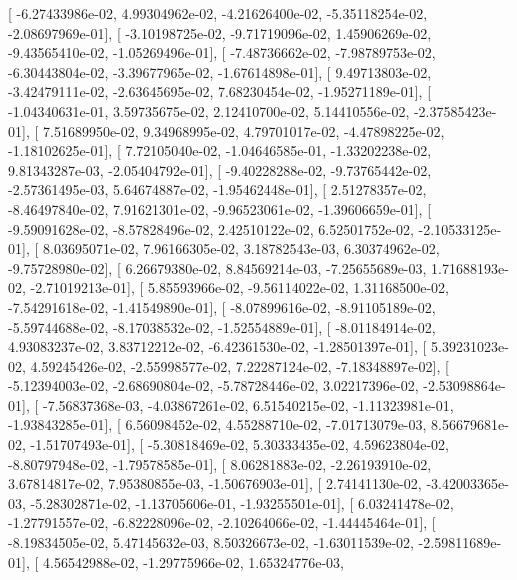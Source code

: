 \documentclass{article}
\begin{document}
       [ -6.27433986e-02,   4.99304962e-02,  -4.21626400e-02,
         -5.35118254e-02,  -2.08697969e-01],
       [ -3.10198725e-02,  -9.71719096e-02,   1.45906269e-02,
         -9.43565410e-02,  -1.05269496e-01],
       [ -7.48736662e-02,  -7.98789753e-02,  -6.30443804e-02,
         -3.39677965e-02,  -1.67614898e-01],
       [  9.49713803e-02,  -3.42479111e-02,  -2.63645695e-02,
          7.68230454e-02,  -1.95271189e-01],
       [ -1.04340631e-01,   3.59735675e-02,   2.12410700e-02,
          5.14410556e-02,  -2.37585423e-01],
       [  7.51689950e-02,   9.34968995e-02,   4.79701017e-02,
         -4.47898225e-02,  -1.18102625e-01],
       [  7.72105040e-02,  -1.04646585e-01,  -1.33202238e-02,
          9.81343287e-03,  -2.05404792e-01],
       [ -9.40228288e-02,  -9.73765442e-02,  -2.57361495e-03,
          5.64674887e-02,  -1.95462448e-01],
       [  2.51278357e-02,  -8.46497840e-02,   7.91621301e-02,
         -9.96523061e-02,  -1.39606659e-01],
       [ -9.59091628e-02,  -8.57828496e-02,   2.42510122e-02,
          6.52501752e-02,  -2.10533125e-01],
       [  8.03695071e-02,   7.96166305e-02,   3.18782543e-03,
          6.30374962e-02,  -9.75728980e-02],
       [  6.26679380e-02,   8.84569214e-03,  -7.25655689e-03,
          1.71688193e-02,  -2.71019213e-01],
       [  5.85593966e-02,  -9.56114022e-02,   1.31168500e-02,
         -7.54291618e-02,  -1.41549890e-01],
       [ -8.07899616e-02,  -8.91105189e-02,  -5.59744688e-02,
         -8.17038532e-02,  -1.52554889e-01],
       [ -8.01184914e-02,   4.93083237e-02,   3.83712212e-02,
         -6.42361530e-02,  -1.28501397e-01],
       [  5.39231023e-02,   4.59245426e-02,  -2.55998577e-02,
          7.22287124e-02,  -7.18348897e-02],
       [ -5.12394003e-02,  -2.68690804e-02,  -5.78728446e-02,
          3.02217396e-02,  -2.53098864e-01],
       [ -7.56837368e-03,  -4.03867261e-02,   6.51540215e-02,
         -1.11323981e-01,  -1.93843285e-01],
       [  6.56098452e-02,   4.55288710e-02,  -7.01713079e-03,
          8.56679681e-02,  -1.51707493e-01],
       [ -5.30818469e-02,   5.30333435e-02,   4.59623804e-02,
         -8.80797948e-02,  -1.79578585e-01],
       [  8.06281883e-02,  -2.26193910e-02,   3.67814817e-02,
          7.95380855e-03,  -1.50676903e-01],
       [  2.74141130e-02,  -3.42003365e-03,  -5.28302871e-02,
         -1.13705606e-01,  -1.93255501e-01],
       [  6.03241478e-02,  -1.27791557e-02,  -6.82228096e-02,
         -2.10264066e-02,  -1.44445464e-01],
       [ -8.19834505e-02,   5.47145632e-03,   8.50326673e-02,
         -1.63011539e-02,  -2.59811689e-01],
       [  4.56542988e-02,  -1.29775966e-02,   1.65324776e-03,
\end{document}

